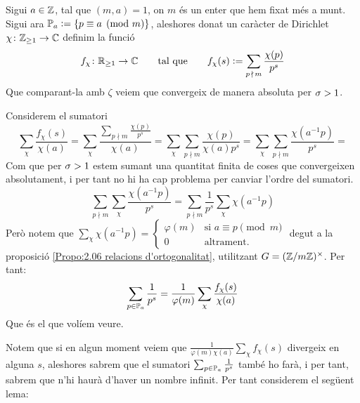 Sigui $a\in\mathbb Z$, tal que $(m,a)=1$, on $m$ és un enter que hem fixat més a munt. Sigui ara $\mathbb P_a\vcentcolon=\{p\equiv a\pmod{m}\}$, aleshores donat un caràcter de Dirichlet $\chi\colon{\mathbb Z_{\geq1}}\to \mathbb C$ definim la funció 
\[
f_\chi\colon \mathbb R_{\geq1}\to \mathbb C\qquad \text{tal que}\qquad f_\chi(s)\vcentcolon=\sum_{p\,\nmid\,m}\frac{\chi(p)}{p^s}
\]
Que comparant-la amb $\zeta$ veiem que convergeix de manera absoluta per $\sigma>1$.
\begin{pf}
    Considerem el sumatori
    \[
    \sum_\chi\frac{f_\chi(s)}{\chi(a)}=
    \sum_\chi\frac{\sum_{p\nmid m}\frac{\chi(p)}{p^s}}{\chi(a)}=
    \sum_\chi\sum_{p\nmid m}\frac{\chi(p)}{\chi(a)p^s}=
    \sum_\chi\sum_{p\nmid m}\frac{\chi(a^{-1}p)}{p^s}=
    \]
    Com que per $\sigma>1$ estem sumant una quantitat finita de coses que convergeixen absolutament, i per tant no hi ha cap problema per canviar l'ordre del sumatori.
    \[
    \sum_{p\nmid m}\sum_\chi\frac{\chi(a^{-1}p)}{p^s}=
    \sum_{p\nmid m}
    \frac{1}{p^s}
    \sum_\chi\chi(a^{-1}p)
    \]
    Però notem que $\sum_\chi\chi(a^{-1}p)=\left\{\begin{array}{cl}
        \varphi(m)&\text{si }a\equiv p\pmod{m}\\
        0&\text{altrament.}
    \end{array}\right.$ degut a la proposició \ref{Propo:2.06 relacions d'ortogonalitat}, utilitzant $G=(\mathbb Z/m\mathbb Z)^\times$. Per tant:
    \[
    \sum_{p\in\mathbb P_a}\frac{1}{p^s}=\frac{1}{\varphi(m)}\sum_{\chi}\frac{f_\chi(s)}{\chi(a)}
    \]
    Que és el que volíem veure.
\end{pf}

Notem que si en algun moment veiem que $\frac{1}{\varphi(m)\chi(a)}\sum_{\chi}f_\chi(s)$ divergeix en alguna $s$, aleshores sabrem que el sumatori $\sum_{p\in\mathbb P_a}\frac{1}{p^s}$ també ho farà, i per tant, sabrem que n'hi haurà d'haver un nombre infinit. Per tant considerem el següent lema:

